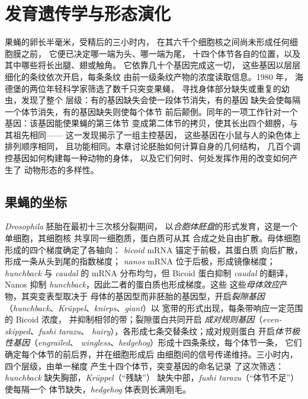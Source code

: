 \chapter{发育遗传学与形态演化}\label{ch:b3:developmental-genetics}

果蝇的卵长半毫米，受精后的三小时内，
在其六千个细胞核之间尚未形成任何细胞膜之前，
它便已决定哪一端为头、哪一端为尾，
十四个体节各自的位置，以及其中哪些将长出腿、翅或触角。
它依靠几十个基因完成这一切，
这些基因以层层细化的条纹依次开启，每条条纹
由前一级条纹产物的浓度读取信息。1980 年，
海德堡的两位年轻科学家筛选了数千只突变果蝇，
寻找身体部分缺失或重复的幼虫，发现了整个
层级：有的基因缺失会使一段体节消失，有的基因
缺失会使每隔一个体节消失，有的基因缺失则使每个体节
前后颠倒。同年的一项工作针对一个基因：该基因能使果蝇的第三体节
变成第二体节的拷贝，使其长出四个翅膀，与其祖先相同——
这一发现揭示了一组主控基因，
这些基因在小鼠与人的染色体上排列顺序相同，
且功能相同。本章讨论胚胎如何计算自身的几何结构，
几百个调控基因如何构建每一种动物的身体，
以及它们何时、何处发挥作用的改变如何产生了
动物形态的多样性。

\section{果蝇的坐标}

\begin{definition}[体节划分层级]\label{def:b3:developmental-genetics:hierarchy}
\emph{Drosophila} 胚胎在最初十三次核分裂期间，
以\emph{合胞体胚盘}的形式发育，这是一个单细胞，其细胞核
共享同一细胞质，蛋白质可从其
合成之处自由扩散。母体细胞形成的四个梯度确定了各轴向：
\emph{bicoid} mRNA 锚定于前极，其蛋白质
向后扩散，形成一条从头到尾的指数梯度；
\emph{nanos} mRNA 位于后极，形成镜像梯度；
\emph{hunchback} 与 \emph{caudal} 的 mRNA 分布均匀，但 Bicoid
蛋白抑制 \emph{caudal} 的翻译，Nanos 抑制
\emph{hunchback}，因此二者的蛋白质也形成梯度。这些
这些\emph{母体效应}产物，其突变表型取决于
母体的基因型而非胚胎的基因型，开启\emph{裂隙基因}
（\emph{hunchback}、\emph{Krüppel}、\emph{knirps}、\emph{giant}）以
宽带的形式出现，每条带响应一定范围的 Bicoid 浓度，
并抑制相邻的带；裂隙蛋白共同开启
\emph{成对规则基因}（\emph{even-skipped}、\emph{fushi tarazu}、
\emph{hairy}），各形成七条交替条纹；成对规则蛋白
开启\emph{体节极性基因}（\emph{engrailed}、
\emph{wingless}、\emph{hedgehog}）形成十四条条纹，每个体节一条，
它们确定每个体节的前后界，并在细胞形成后
由细胞间的信号传递维持。三小时内，四个层级，由单一梯度
产生十四个体节，突变基因的命名记录
了这次筛选：\emph{hunchback} 缺失胸部，\emph{Krüppel}（“残缺”）
缺失中部，\emph{fushi tarazu}（“体节不足”）使每隔一个
体节缺失，\emph{hedgehog} 体表则长满刚毛。
\end{definition}

